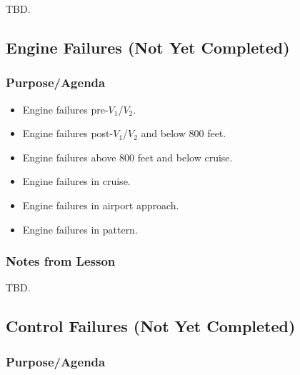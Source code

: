 \documentclass[letterpaper,10pt,titlepage]{article}
\begin{document}
TBD.



\subsection{Engine Failures (Not Yet Completed)}
\label{sfle0:sefa0}



\subsubsection{Purpose/Agenda}
\label{sfle0:sefa0:spov0}

\begin{itemize}
\item Engine failures pre-$V_1$/$V_2$.
\item Engine failures post-$V_1$/$V_2$ and below 800 feet.
\item Engine failures above 800 feet and below cruise.
\item Engine failures in cruise.
\item Engine failures in airport approach.
\item Engine failures in pattern.
\end{itemize}


\subsubsection{Notes from Lesson}
\label{sfle0:sefa0:snff0}

TBD.


\subsection{Control Failures (Not Yet Completed)}
\label{sfle0:scfa0}



\subsubsection{Purpose/Agenda}
\label{sfle0:scfa0:spov0}
\end{document}
